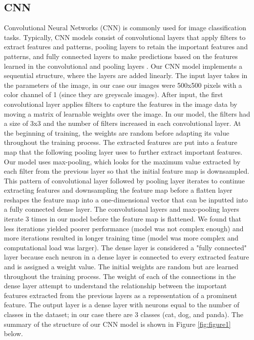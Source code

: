 \subsection{CNN}
Convolutional Neural Networks (CNN) is commonly used for image classification tasks. Typically, CNN models consist of convolutional layers that apply filters to extract features and patterns, pooling layers to retain the important features and patterns, and fully connected layers to make predictions based on the features learned in the convolutional and pooling layers \cite{CNNGuide}.
Our CNN model implements a sequential structure, where the layers are added linearly. The input layer takes in the parameters of the image, in our case our images were 500x500 pixels with a color channel of 1 (since they are greyscale images). After input, the first convolutional layer applies filters to capture the features in the image data by moving a matrix of learnable weights over the image. In our model, the filters had a size of 3x3 and the number of filters increased in each convolutional layer. At the beginning of training, the weights are random before adapting its value throughout the training process. The extracted features are put into a feature map that the following pooling layer uses to further extract important features. Our model uses max-pooling, which looks for the maximum value extracted by each filter from the previous layer so that the initial feature map is downsampled. This pattern of convolutional layer followed by pooling layer iterates to continue extracting features and downsampling the feature map before a flatten layer reshapes the feature map into a one-dimensional vector that can be inputted into a fully connected dense layer. The convolutional layers and max-pooling layers iterate 3 times in our model before the feature map is flattened. We found that less iterations yielded poorer performance (model was not complex enough) and more iterations resulted in longer training time (model was more complex and computational load was larger). The dense layer is considered a "fully connected" layer because each neuron in a dense layer is connected to every extracted feature and is assigned a weight value. The initial weights are random but are learned throughout the training process. The weight of each of the connections in the dense layer attempt to understand the relationship between the important features extracted from the previous layers as a representation of a prominent feature. The output layer is a dense layer with neurons equal to the number of classes in the dataset; in our case there are 3 classes (cat, dog, and panda). The summary of the structure of our CNN model is shown in Figure \ref{fig:figure1} below.

